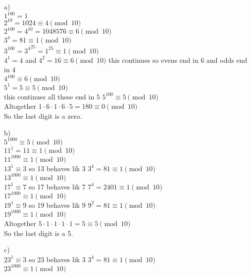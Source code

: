 
a)\\
$1^{100} = 1$ \\

$2^{10} = 1024 \equiv 4 \pmod{10}$ \\
$2^{100} = 4^{10} = 1048576 \equiv 6 \pmod{10}$\\

$3^{4} = 81 \equiv 1 \pmod{10}$\\
$3^{100} = {3^{4}}^{25} = 1^{25} \equiv 1 \pmod{10}$\\

$4^{1} = 4$ and $4^{2} = 16 \equiv 6 \pmod{10}$ this continues so evens end in 6 and odds end in 4\\
$4^{100} \equiv 6 \pmod{10}$\\

$5^{1} = 5 \equiv 5 \pmod{10}$\\ this continues all these end in 5
$5^{100} \equiv 5 \pmod{10}$\\

Altogether $1 \cdot 6 \cdot 1 \cdot 6 \cdot 5 = 180 \equiv 0 \pmod{10}$\\
So the last digit is a zero.

b)\\
$5^{1000} \equiv 5 \pmod{10}$\\

$11^{1} = 11 \equiv 1 \pmod{10}$ \\
$11^{1000} \equiv 1 \pmod{10}$\\

$13^{1} \equiv 3$ so 13 behaves lik 3 $3^{4} = 81 \equiv 1 \pmod{10}$\\
$13^{1000} \equiv 1 \pmod{10}$\\

$17^{1} \equiv 7$ so 17 behaves lik 7 $7^{4} = 2401 \equiv 1 \pmod{10}$\\
$17^{1000} \equiv 1 \pmod{10}$\\

$19^{1} \equiv 9$ so 19 behaves lik 9 $9^{2} = 81 \equiv 1 \pmod{10}$\\
$19^{1000} \equiv 1 \pmod{10}$\\

Altogether $5 \cdot 1 \cdot 1 \cdot 1 \cdot 1 = 5 \equiv 5 \pmod{10}$\\
So the last digit is a 5.

c)\\
$23^{1} \equiv 3$ so 23 behaves lik 3 $3^{4} = 81 \equiv 1 \pmod{10}$\\
$23^{1000} \equiv 1 \pmod{10}$\\

